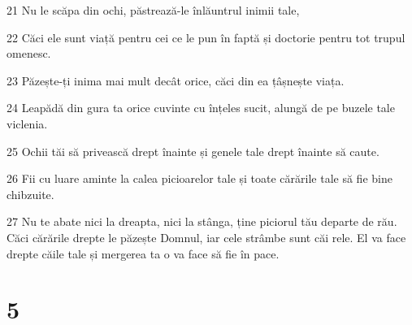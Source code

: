 \par 21 Nu le scăpa din ochi, păstrează-le înlăuntrul inimii tale,
\par 22 Căci ele sunt viață pentru cei ce le pun în faptă și doctorie pentru tot trupul omenesc.
\par 23 Păzește-ți inima mai mult decât orice, căci din ea țâșnește viața.
\par 24 Leapădă din gura ta orice cuvinte cu înțeles sucit, alungă de pe buzele tale viclenia.
\par 25 Ochii tăi să privească drept înainte și genele tale drept înainte să caute.
\par 26 Fii cu luare aminte la calea picioarelor tale și toate cărările tale să fie bine chibzuite.
\par 27 Nu te abate nici la dreapta, nici la stânga, ține piciorul tău departe de rău. Căci cărările drepte le păzește Domnul, iar cele strâmbe sunt căi rele. El va face drepte căile tale și mergerea ta o va face să fie în pace.

\chapter{5}

